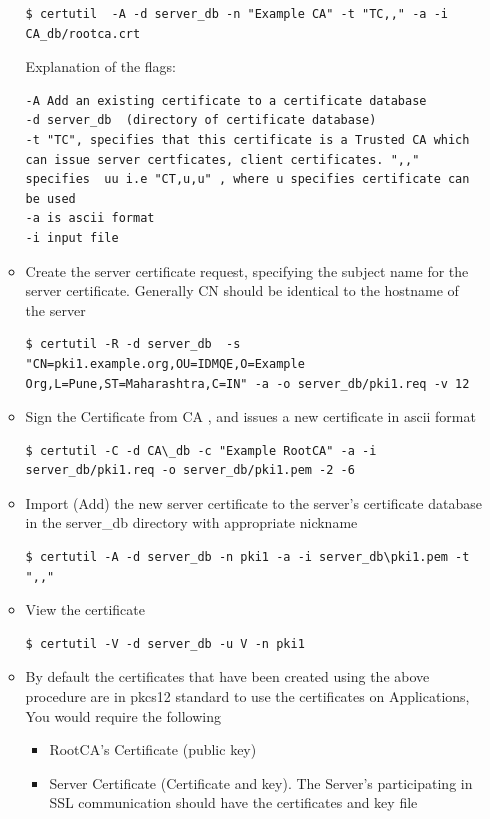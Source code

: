 \documentclass[12pt]{report}
\begin{document}
\begin{enumerate}[label*=\arabic*.]
\begin{itemize}
                \begin{lstlisting}[style=BashInputStyle]
$ certutil  -A -d server_db -n "Example CA" -t "TC,," -a -i CA_db/rootca.crt
                \end{lstlisting}
            Explanation of the flags:
                \begin{lstlisting}
-A Add an existing certificate to a certificate database
-d server_db  (directory of certificate database)
-t "TC", specifies that this certificate is a Trusted CA which can issue server certficates, client certificates. ",," specifies  uu i.e "CT,u,u" , where u specifies certificate can be used
-a is ascii format
-i input file
                \end{lstlisting}
            \item Create the server certificate request, specifying the subject name for the server certificate. Generally CN should be identical to the hostname of the server
                \begin{lstlisting}[style=BashInputStyle]
$ certutil -R -d server_db  -s "CN=pki1.example.org,OU=IDMQE,O=Example Org,L=Pune,ST=Maharashtra,C=IN" -a -o server_db/pki1.req -v 12
                \end{lstlisting}
            \item Sign the Certificate from CA , and  issues a  new certificate in ascii format

                \begin{lstlisting}[style=BashInputStyle]
$ certutil -C -d CA\_db -c "Example RootCA" -a -i server_db/pki1.req -o server_db/pki1.pem -2 -6
                \end{lstlisting}

            \item Import (Add) the new server certificate to the server's certificate database in the server\_db directory with appropriate nickname
                 \begin{lstlisting}[style=BashInputStyle]
$ certutil -A -d server_db -n pki1 -a -i server_db\pki1.pem -t ",,"
                 \end{lstlisting}

            \item View the certificate
                \begin{lstlisting}[style=BashInputStyle]
$ certutil -V -d server_db -u V -n pki1
                \end{lstlisting}

            \item By default the certificates that have been created using the above procedure are in pkcs12 standard to use the certificates on Applications,  You would require the following
                \begin{itemize}
                    \item RootCA's Certificate (public key)
                    \item Server Certificate (Certificate and key). The Server's participating in SSL communication should have the certificates and key file
                \end{itemize}


\end{itemize}
\end{enumerate}
\end{document}
